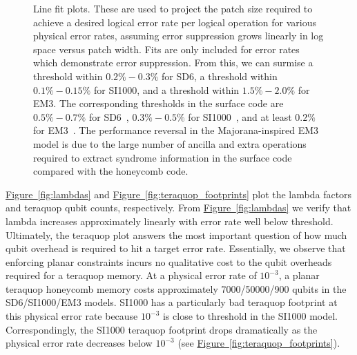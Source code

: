 \documentclass[onecolumn,unpublished,a4paper]{quantumarticle}
\theoremstyle{definition}
\theoremstyle{definition}
\theoremstyle{definition}
\newcommand{\fig}[1]{\hyperref[fig:#1]{Figure~\ref*{fig:#1}}}
\begin{document}
\begin{figure}[ht!]
    \centering
    \caption{
    Line fit plots.
    These are used to project the patch size required to achieve a desired logical error rate per logical operation for various physical error rates, assuming error suppression grows linearly in log space versus patch width.
    Fits are only included for error rates which demonstrate error suppression.  From this, we can surmise a threshold within $0.2\%-0.3\%$ for SD6, a threshold within $0.1\%-0.15\%$ for SI1000, and a threshold within $1.5\%-2.0\% $ for EM3.  
    The corresponding thresholds in the surface code are $0.5\%-0.7\%$ for SD6~\cite{gidney2021honeycombmemory}, $0.3\%-0.5\%$ for SI1000~\cite{gidney2021honeycombmemory}, and at least $0.2\%$ for EM3~\cite{chao2020optimization}.
    The performance reversal in the Majorana-inspired EM3 model is due to the large number of ancilla and extra operations required to extract syndrome information in the surface code compared with the honeycomb code.
    }
    \label{fig:line_fits}
\end{figure}

\fig{lambdas} and \fig{teraquop_footprints} plot the lambda factors and teraquop qubit counts, respectively.  
From \fig{lambdas} we verify that lambda increases approximately linearly with error rate well below threshold.
Ultimately, the teraquop plot answers the most important question of how much qubit overhead is required to hit a target error rate.
Essentially, we observe that enforcing planar constraints incurs no qualitative cost to the qubit overheads required for a teraquop memory.
At a physical error rate of $10^{-3}$, a planar teraquop honeycomb memory costs approximately 7000/50000/900 qubits in the SD6/SI1000/EM3 models.
SI1000 has a particularly bad teraquop footprint at this physical error rate because $10^{-3}$ is close to threshold in the SI1000 model.
Correspondingly, the SI1000 teraquop footprint drops dramatically as the physical error rate decreases below $10^{-3}$ (see \fig{teraquop_footprints}).
\end{document}
